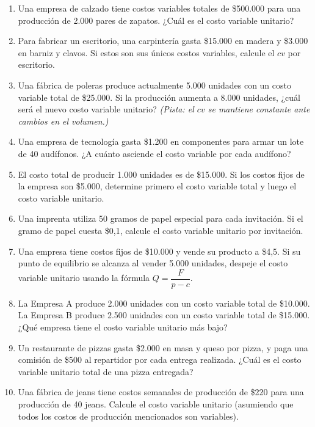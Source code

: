 \documentclass[12pt,a4paper]{article}
\newcommand{\answerspace}{\vspace{4.5cm}}
\newcommand{\lastanswerspace}{\vspace{2cm}}
\begin{document}
\begin{enumerate}[label=\textbf{\alph*.}, leftmargin=*, itemsep=0pt]

\item Una empresa de calzado tiene costos variables totales de \$500.000 para una producción de 2.000 pares de zapatos. ¿Cuál es el costo variable unitario?
\answerspace

\item Para fabricar un escritorio, una carpintería gasta \$15.000 en madera y \$3.000 en barniz y clavos. Si estos son sus únicos costos variables, calcule el $cv$ por escritorio.
\answerspace

\item Una fábrica de poleras produce actualmente 5.000 unidades con un costo variable total de \$25.000. Si la producción aumenta a 8.000 unidades, ¿cuál será el nuevo costo variable unitario? \textit{(Pista: el $cv$ se mantiene constante ante cambios en el volumen.)}
\answerspace

\item Una empresa de tecnología gasta \$1.200 en componentes para armar un lote de 40 audífonos. ¿A cuánto asciende el costo variable por cada audífono?
\answerspace

\item El costo total de producir 1.000 unidades es de \$15.000. Si los costos fijos de la empresa son \$5.000, determine primero el costo variable total y luego el costo variable unitario.
\answerspace

\item Una imprenta utiliza 50 gramos de papel especial para cada invitación. Si el gramo de papel cuesta \$0,1, calcule el costo variable unitario por invitación.
\answerspace

\item Una empresa tiene costos fijos de \$10.000 y vende su producto a \$4,5. Si su punto de equilibrio se alcanza al vender 5.000 unidades, despeje el costo variable unitario usando la fórmula $Q = \dfrac{F}{p-c}$.
\answerspace

\item La Empresa A produce 2.000 unidades con un costo variable total de \$10.000. La Empresa B produce 2.500 unidades con un costo variable total de \$15.000. ¿Qué empresa tiene el costo variable unitario más bajo?
\answerspace

\item Un restaurante de pizzas gasta \$2.000 en masa y queso por pizza, y paga una comisión de \$500 al repartidor por cada entrega realizada. ¿Cuál es el costo variable unitario total de una pizza entregada?
\answerspace

\item Una fábrica de jeans tiene costos semanales de producción de \$220 para una producción de 40 jeans. Calcule el costo variable unitario (asumiendo que todos los costos de producción mencionados son variables).
\lastanswerspace

\end{enumerate}
\end{document}
